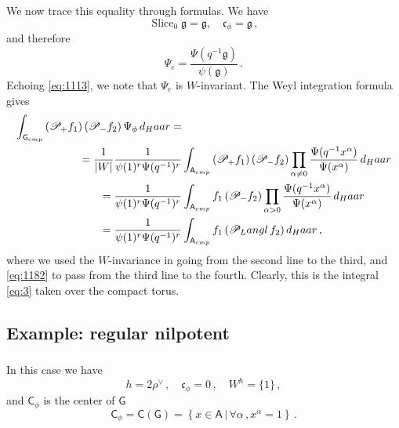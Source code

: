 \documentclass[14pt]{extarticle}
\newcommand{\bA}{\mathsf{A}}
\newcommand{\bG}{\mathsf{G}}
\newcommand{\bC}{\mathsf{C}}
\newcommand{\cP}{\mathscr{P}}
\newcommand{\fg}{\mathfrak{g}}
\newcommand{\fc}{\mathfrak{c}}
\newcommand{\Langl}{\textup{Langl}}
\newcommand{\comp}{\textup{cmp}}
\DeclareMathOperator{\Slice}{Slice}
\theoremstyle{definition}
\begin{document}
\subsubsection{}
We now trace this equality through formulas. We have
\[
  \Slice_0 \fg = \fg, \quad \fc_\phi = \fg \,,
\]
and therefore 
\[
  \Psi_e = \frac{\Psi(q^{-1} \fg)}{\psi(\fg)} \,.
\]
Echoing \eqref{eq:1113}, we note that $\Psi_e$  is $W$-invariant. The
Weyl integration formula gives 
%
\begin{align}
  \int_{\bG_{\comp}} \left(\cP_+ f_1 \right) 
    \left(\cP_- f_2 \right) \Psi_\phi \, 
    d_\textup{Haar}  = &\notag \\
    = \frac{1}{|W|}
    \frac{1}{\psi(1)^r \Psi(q^{-1})^r}
    &\int_{\bA_{\comp}} \left(\cP_+ f_1 \right)
    \left(\cP_-f_2 \right) \prod_{\alpha\ne 0} \frac{\Psi(q^{-1}
      x^\alpha)}
    { \Psi(x^{\alpha})}\, 
    d_\textup{Haar} \notag \\
    = 
    \frac{1}{\psi(1)^r \Psi(q^{-1})^r}
    &\int_{\bA_{\comp}} f_1 
    \left(\cP_- f_2 \right)
\prod_{\alpha> 0} \frac{\Psi(q^{-1}
      x^\alpha)}
    { \Psi(x^{\alpha})}
    \, 
    d_\textup{Haar} \notag \\
    =
    \frac{1}{\psi(1)^r \Psi(q^{-1})^r}
    &\int_{\bA_{\comp}} f_1 
    \left(\cP_\Langl \, f_2 \right)
    d_\textup{Haar}\,,  \label{eq:140}
  \end{align}
%
where we used the $W$-invariance in going from the second line to the
third, and \eqref{eq:1182} to pass from the third line to the fourth. Clearly, this is the
integral \eqref{eq:3} taken over the compact torus.


\subsection{Example: regular nilpotent}\label{s_ex_reg}


\subsubsection{}

In this case we have
\[
  h= 2 \rho^\vee \,, \quad \fc_\phi = 0 \,, \quad W^h = \{1\} \,,
\]
and $\bC_\phi$ is the center of $\bG$ 
\[
  \bC_\phi = \bC(\bG) =\left\{ x \in \bA \, \big|\,  \forall \alpha\,,
  x^\alpha =1 \right\} \,.  
\]

\subsubsection{}
\end{document}
